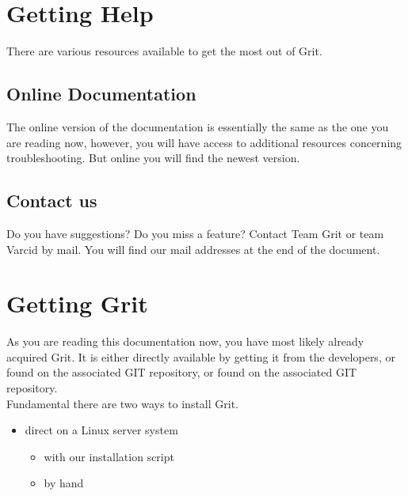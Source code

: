 \documentclass[10pt,a4paper, titlepage, toc=idx]{scrreprt}
\theoremstyle{definition}
\theoremstyle{plain}
\newcommand*{\product}{Grit}
\begin{document}
\chapter{Getting Help}
	There are various resources available to get the most out of \product. 
	\section{Online Documentation}
	The online version of the documentation is essentially the
	same as the one you are reading now, however, you will have
	access to additional resources concerning troubleshooting.
	But online you will find the newest version.
	\section{Contact us}
	Do you have suggestions? Do you miss a feature? Contact {\sc Team Grit} or {\sc team Varcid} by mail. 
	You will find our mail addresses at the end of the document.
\chapter{Getting \product}
As you are reading this documentation now, you have most
likely already acquired \product. It is either directly
available by getting it from the developers, or found on the associated
GIT repository, or found on the associated GIT repository.\\

\noindent Fundamental there are two ways to install \product . 
\begin{itemize}
\item direct on a Linux server system
\begin{itemize}
\item with our installation script
\item by hand 
\end{itemize}
\end{itemize}
\end{document}
